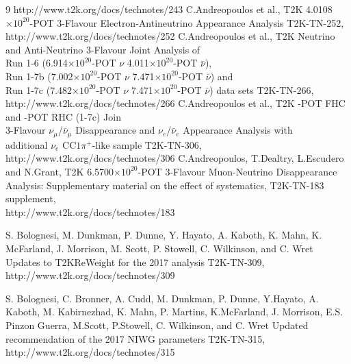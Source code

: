 \begin{thebibliography}{9}
   http://www.t2k.org/docs/technotes/243
   C.Andreopoulos et al.,
   T2K 4.0108$\times10^{20}$-POT 3-Flavour Electron-Antineutrino Appearance Analysis
   T2K-TN-252,\\
   http://www.t2k.org/docs/technotes/252
   C.Andreopoulos et al.,
   T2K Neutrino and Anti-Neutrino 3-Flavour Joint Analysis of  \\
   Run 1-6  (6.914$\times10^{20}$-POT $\nu$ 4.011$\times10^{20}$-POT $\bar{\nu}$), \\
   Run 1-7b (7.002$\times10^{20}$-POT $\nu$ 7.471$\times10^{20}$-POT $\bar{\nu}$) and \\
   Run 1-7c (7.482$\times10^{20}$-POT $\nu$ 7.471$\times10^{20}$-POT $\bar{\nu}$)
   data sets
   T2K-TN-266,\\
   http://www.t2k.org/docs/technotes/266
   C.Andreopoulos et al.,
   T2K \TotalPotNuRunOneSevenC-POT FHC and \TotalPotNuBarRunOneSevenC-POT RHC (1-7c) Join \\
   3-Flavour $\nu_\mu$/$\bar{\nu}_\mu$ Disappearance and $\nu_e$/$\bar{\nu}_e$ Appearance Analysis with \\
   additional $\nu_e$ CC$1\pi^{+}$-like sample
   T2K-TN-306,\\
   http://www.t2k.org/docs/technotes/306
%
%
  C.Andreopoulos, T.Dealtry, L.Escudero and N.Grant,
  T2K 6.5700$\times10^{20}$-POT 3-Flavour Muon-Neutrino Disappearance Analysis:
  Supplementary material on the effect of systematics,
  T2K-TN-183 supplement,\\
  http://www.t2k.org/docs/technotes/183

  S. Bolognesi, M. Dunkman, P. Dunne, Y. Hayato, A. Kaboth, K. Mahn, K. McFarland, J. Morrison, M. Scott, P. Stowell, C. Wilkinson, and C. Wret
  Updates to T2KReWeight for the 2017 analysis
  T2K-TN-309,\\
  http://www.t2k.org/docs/technotes/309

  S. Bolognesi, C. Bronner, A. Cudd, M. Dunkman, P. Dunne, Y.Hayato, A. Kaboth, M. Kabirnezhad, K. Mahn, P. Martins, K.McFarland, J. Morrison, E.S. Pinzon Guerra, M.Scott, P.Stowell, C. Wilkinson, and C. Wret
  Updated recommendation of the 2017 NIWG parameters
  T2K-TN-315,\\
  http://www.t2k.org/docs/technotes/315


\end{thebibliography}
